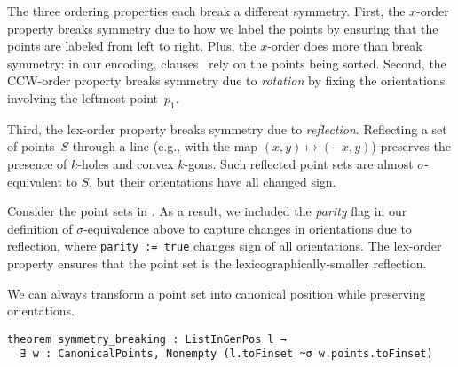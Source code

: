 The three ordering properties each break a different symmetry.
First, the $x$-order property breaks symmetry due to how we label the points by ensuring that the points are labeled from left to right.
Plus,
the $x$-order does more than break symmetry:
in our encoding, clauses~ rely on the points being sorted.
Second, the CCW-order property breaks symmetry due to \emph{rotation} by fixing the orientations involving the leftmost point~$p_1$.

Third, the lex-order property breaks symmetry due to \emph{reflection}.
Reflecting a set of points~$S$ through a line (e.g., with the map $(x, y) \mapsto (-x, y)$)
preserves the presence of $k$-holes and convex $k$-gons.
Such reflected point sets are almost $\sigma$-equivalent to $S$,
but their orientations have all changed sign.

Consider the point sets in .
As a result,
we included the \emph{parity} flag in our definition of $\sigma$-equivalence above
to capture changes in orientations due to reflection,
where \lstinline|parity := true| changes sign of all orientations.
The lex-order property ensures that the point set is the lexicographically-smaller reflection.

We can always transform a point set into canonical position while preserving orientations.


\begin{lstlisting}
theorem symmetry_breaking : ListInGenPos l →
  ∃ w : CanonicalPoints, Nonempty (l.toFinset ≃σ w.points.toFinset)
\end{lstlisting}


